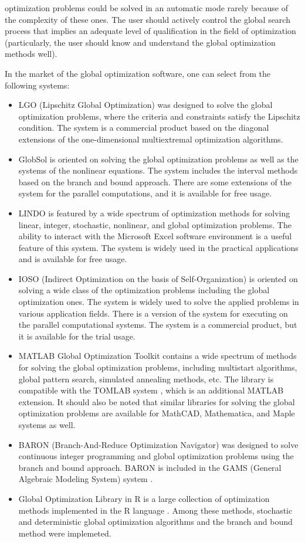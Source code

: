 \documentclass{aims}
\theoremstyle{definition}
\begin{document}
optimization problems could be solved in an automatic mode rarely because of the
complexity of these ones. The user should actively control the global search
process that implies an adequate level of qualification in the field of optimization
(particularly, the user should know and understand the global optimization methods well).
\par
In the market of the global optimization software, one can select from the following systems:
\begin{itemize}
\item LGO (Lipschitz Global Optimization) \cite{pinterGO} was designed to solve the global
optimization problems, where the criteria and constraints satisfy the Lipschitz condition.
The system is a commercial product based on the diagonal extensions of the one-dimensional multiextremal optimization algorithms.
\item GlobSol \cite{kearfott2009} is oriented on solving the global optimization
problems as well as the systems of the nonlinear equations. The system includes
the interval methods based on the branch and bound approach. There are some extensions
of the system for the parallel computations, and it is available for free usage.
\item LINDO \cite{linSchrage2009} is featured by a wide spectrum of optimization methods for solving linear, integer, stochastic, nonlinear, and global optimization problems. The ability to interact with the Microsoft Excel software environment is a useful feature of this system. The system is widely used in the practical applications and is available for free usage.
\item IOSO (Indirect Optimization on the basis of Self-Organization) \cite{iosoDescription} is oriented on solving a wide class of the optimization problems including the global optimization ones. The system is widely used to solve the applied problems in various application fields. There is a version of the system for executing on the parallel computational systems. The system is a commercial product, but it is available for the trial usage.
\item MATLAB Global Optimization Toolkit \cite{venkataraman2009} contains a wide
spectrum of methods for solving the global optimization problems, including multistart
algorithms, global pattern search, simulated annealing methods, etc. The library is
compatible with the TOMLAB system \cite{holmstromEdvall2004}, which is an additional
MATLAB extension. It should also be noted that similar libraries for solving the global
optimization problems are available for MathCAD, Mathematica, and Maple systems as well.
\item BARON (Branch-And-Reduce Optimization Navigator) \cite{sahinidis1996} was designed to
solve continuous integer programming and global optimization problems using the branch and
bound approach. BARON is included in the GAMS (General Algebraic Modeling System) system \cite{bussieckMeeraus2004}.
\item Global Optimization Library in R is a large collection of optimization methods
implemented in the R language \cite{mullen2014}. Among these methods, stochastic and
deterministic global optimization algorithms and the branch and bound method were implemeted.
\end{itemize}
\end{document}
